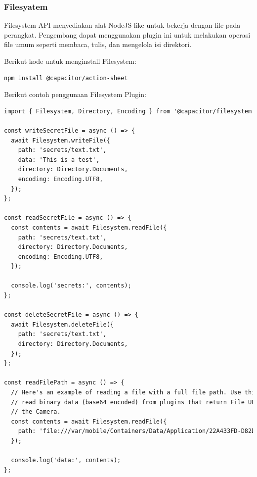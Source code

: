 \subsubsection{Filesyatem}
Filesystem API menyediakan alat NodeJS-like untuk bekerja dengan file pada perangkat. Pengembang dapat menggunakan plugin ini untuk melakukan operasi file umum seperti membaca, tulis, dan mengelola isi direktori.

Berikut kode untuk menginstall Filesystem:

\begin{lstlisting}[language=HTML, caption=Kode untuk menginstal plugin Filesystem, label=kode:install-filesystem-capacitor]
npm install @capacitor/action-sheet
\end{lstlisting}

Berikut contoh penggunaan Filesystem Plugin:
\begin{lstlisting}[language=HTML, caption=Contoh kode dari penggunaan Filesystem, label=kode:example-of-filesystem-capacitor]
import { Filesystem, Directory, Encoding } from '@capacitor/filesystem';

const writeSecretFile = async () => {
  await Filesystem.writeFile({
    path: 'secrets/text.txt',
    data: 'This is a test',
    directory: Directory.Documents,
    encoding: Encoding.UTF8,
  });
};

const readSecretFile = async () => {
  const contents = await Filesystem.readFile({
    path: 'secrets/text.txt',
    directory: Directory.Documents,
    encoding: Encoding.UTF8,
  });

  console.log('secrets:', contents);
};

const deleteSecretFile = async () => {
  await Filesystem.deleteFile({
    path: 'secrets/text.txt',
    directory: Directory.Documents,
  });
};

const readFilePath = async () => {
  // Here's an example of reading a file with a full file path. Use this to
  // read binary data (base64 encoded) from plugins that return File URIs, such as
  // the Camera.
  const contents = await Filesystem.readFile({
    path: 'file:///var/mobile/Containers/Data/Application/22A433FD-D82D-4989-8BE6-9FC49DEA20BB/Documents/text.txt',
  });

  console.log('data:', contents);
};
\end{lstlisting}

